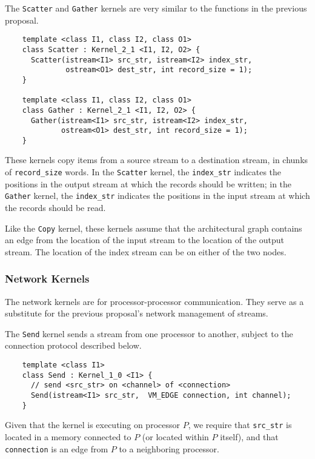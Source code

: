  The {\tt Scatter} and {\tt Gather} kernels are
very similar to the functions in the previous proposal.
{\small
\begin{verbatim}
    template <class I1, class I2, class O1>
    class Scatter : Kernel_2_1 <I1, I2, O2> {
      Scatter(istream<I1> src_str, istream<I2> index_str, 
              ostream<O1> dest_str, int record_size = 1);
    }

    template <class I1, class I2, class O1>
    class Gather : Kernel_2_1 <I1, I2, O2> {
      Gather(istream<I1> src_str, istream<I2> index_str, 
             ostream<O1> dest_str, int record_size = 1);
    }  
\end{verbatim}}

These kernels copy items from a source stream to a destination stream,
in chunks of {\tt record\_size} words.  In the {\tt Scatter} kernel,
the {\tt index\_str} indicates the positions in the output stream at
which the records should be written; in the {\tt Gather} kernel, the
{\tt index\_str} indicates the positions in the input stream at which
the records should be read.

Like the {\tt Copy} kernel, these kernels assume that the
architectural graph contains an edge from the location of the input
stream to the location of the output stream.  The location of the
index stream can be on either of the two nodes.

\subsubsection*{Network Kernels}

The network kernels are for processor-processor communication.  They
serve as a substitute for the previous proposal's network management
of streams.

 The {\tt Send} kernel sends a stream from one processor to
another, subject to the connection protocol described below.
{\small
\begin{verbatim}
    template <class I1>
    class Send : Kernel_1_0 <I1> {
      // send <src_str> on <channel> of <connection>
      Send(istream<I1> src_str,  VM_EDGE connection, int channel);
    }
\end{verbatim}}

Given that the kernel is executing on processor $P$, we require that
{\tt src\_str} is located in a memory connected to $P$ (or located
within $P$ itself), and that {\tt connection} is an edge from $P$ to a
neighboring processor.


